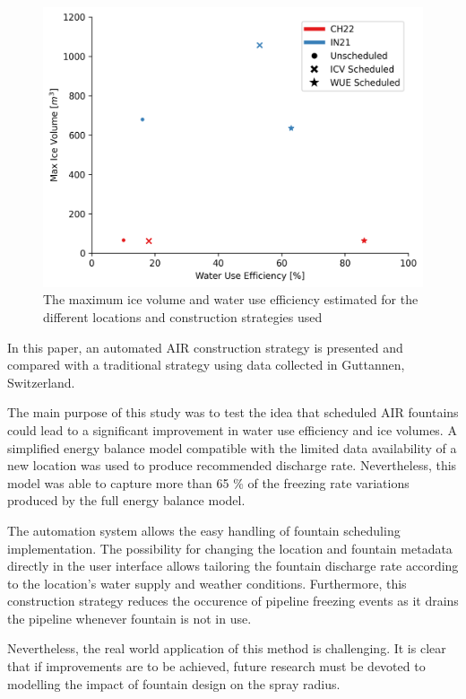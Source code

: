 \documentclass[tc, manuscript]{copernicus}
\begin{document}
\begin{figure}[t]
\includegraphics[width=12cm]{Figures/wue.png}
\caption{The maximum ice volume and water use efficiency estimated for the different locations and construction
strategies used}
\label{fig:wue}
\end{figure}


\conclusions
In this paper, an automated AIR construction strategy is presented and compared with a traditional strategy
using data collected in Guttannen, Switzerland.

The main purpose of this study was to test the idea that scheduled AIR fountains could lead to a significant
improvement in water use efficiency and ice volumes. A simplified energy balance model compatible with the
limited data availability of a new location was used to produce recommended discharge rate. Nevertheless, this
model was able to capture more than 65 \% of the freezing rate variations produced by the full energy balance
model.

The automation system allows the easy handling of fountain scheduling implementation. The possibility for
changing the location and fountain metadata directly in the user interface allows tailoring the fountain
discharge rate according to the location's water supply and weather conditions. Furthermore, this construction
strategy reduces the occurence of pipeline freezing events as it drains the pipeline whenever fountain is not in
use.

Nevertheless, the real world application of this method is challenging. It is clear that if improvements are to
be achieved, future research must be devoted to modelling the impact of fountain design on the spray radius.
\end{document}
